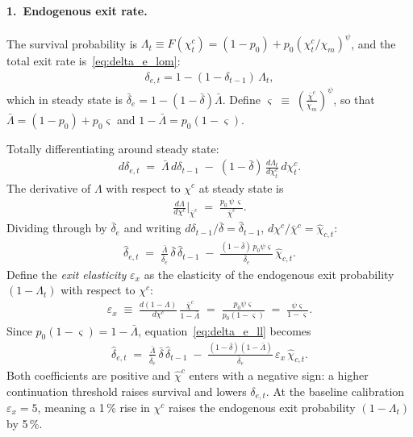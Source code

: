 \documentclass[authoryear, review, 12pt]{elsarticle}
\begin{document}
\paragraph{1.\ Endogenous exit rate.}
The survival probability is $\Lambda_t \equiv F(\chi_t^c) = (1-p_0)+p_0(\chi_t^c/\chi_m)^\psi$,
and the total exit rate is~\eqref{eq:delta_e_lom}:
\begin{align}
    \delta_{e,t} = 1-(1-\delta_{t-1})\,\Lambda_t,
\end{align}
which in steady state is $\bar\delta_e = 1-(1-\bar\delta)\bar\Lambda$.
Define
    $\varsigma \;\equiv\; \left(\frac{\bar\chi^c}{\chi_m}\right)^\psi$, so that $\bar\Lambda = (1-p_0)+p_0\varsigma$ and $1-\bar\Lambda = p_0(1-\varsigma)$.

Totally differentiating around steady state:
\begin{align}
    d\delta_{e,t}
    \;=\; \bar\Lambda\,d\delta_{t-1}
    \;-\; (1-\bar\delta)\,\frac{d\Lambda_t}{d\chi_t^c}\,d\chi_t^c.
\end{align}
The derivative of $\Lambda$ with respect to $\chi^c$ at steady state is
\begin{align}
    \frac{d\Lambda}{d\chi^c}\bigg|_{\bar\chi^c}
    \;=\; \frac{p_0\,\psi\,\varsigma}{\bar\chi^c}.
\end{align}
Dividing through by $\bar\delta_e$ and writing $d\delta_{t-1}/\bar\delta = \hat\delta_{t-1}$,
$d\chi^c/\bar\chi^c = \hat\chi_{c,t}$:
\begin{align}\label{eq:delta_e_ll}
    \hat{\delta}_{e,t}
    \;=\; \frac{\bar\Lambda}{\bar\delta_e}\,\bar\delta\,\hat\delta_{t-1}
    \;-\; \frac{(1-\bar\delta)\,p_0\psi\varsigma}{\bar\delta_e}\,\hat\chi_{c,t}.
\end{align}
Define the \emph{exit elasticity} $\varepsilon_x$ as the elasticity of the endogenous exit
probability $(1-\Lambda_t)$ with respect to $\chi^c$:
\begin{align}\label{eq:dest_elast_def}
    \varepsilon_x \;\equiv\;
    \frac{d(1-\Lambda)}{d\chi^c}\,\frac{\bar\chi^c}{1-\bar\Lambda}
    \;=\; \frac{p_0\psi\varsigma}{p_0(1-\varsigma)}
    \;=\; \frac{\psi\varsigma}{1-\varsigma}.
\end{align}
Since $p_0(1-\varsigma) = 1-\bar\Lambda$, equation~\eqref{eq:delta_e_ll} becomes
\begin{align}\label{eq:delta_e_ll_compact}
    \hat{\delta}_{e,t}
    \;=\; \frac{\bar\Lambda}{\bar\delta_e}\,\bar\delta\,\hat\delta_{t-1}
    \;-\; \frac{(1-\bar\delta)(1-\bar\Lambda)}{\bar\delta_e}\,\varepsilon_x\,\hat\chi_{c,t}.
\end{align}
Both coefficients are positive and $\hat\chi^c$ enters with a negative sign:
a higher continuation threshold raises survival and lowers $\delta_{e,t}$.
At the baseline calibration $\varepsilon_x=5$, meaning a 1\,\% rise in $\chi^c$
raises the endogenous exit probability $(1-\Lambda_t)$ by 5\,\%.
\end{document}
